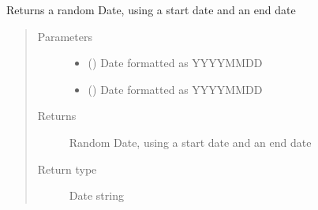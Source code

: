 \documentclass[letterpaper,10pt,english]{sphinxmanual}
\begin{document}
\begin{fulllineitems}
\label{\detokenize{CE_app:CE_app.nihpo_functions.func_nihpo_random_date_between_dates}}
\sphinxAtStartPar
Returns a random Date, using a start date and an end date
\begin{quote}\begin{description}
\item[{Parameters}] \leavevmode\begin{itemize}
\item {} 
\sphinxAtStartPar
{} () \textendash{} Date formatted as YYYY\sphinxhyphen{}MM\sphinxhyphen{}DD

\item {} 
\sphinxAtStartPar
{} () \textendash{} Date formatted as YYYY\sphinxhyphen{}MM\sphinxhyphen{}DD

\end{itemize}

\item[{Returns}] \leavevmode
\sphinxAtStartPar
Random Date, using a start date and an end date

\item[{Return type}] \leavevmode
\sphinxAtStartPar
Date string

\end{description}\end{quote}

\end{fulllineitems}

\end{document}
